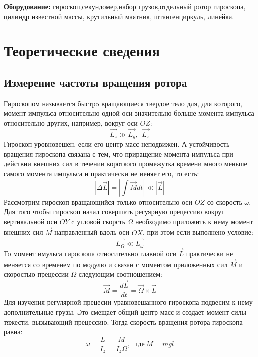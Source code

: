 \documentclass[a4paper,12pt]{article} %
\begin{document}
\textbf{Оборудование:} гироскоп,секундомер,набор грузов,отдельный ротор гироскопа,
 цилиндр известной массы, крутильный маятник,
 штангенциркуль, линейка.

\section{Теоретические сведения}
\subsection{Измерение частоты вращения ротора}

Гироскопом называется быстрo вращающиеся твердое тело для, для которого, момент
импульса относительно одной оси значительно больше момента импульса относительно других, например, вокруг оси $OZ$:
\begin{equation}
    \overrightarrow{L_z} \gg \overrightarrow{L_y}, \ \ \overrightarrow{L_x}
\end{equation}
Гироскоп уровновешен, если его центр масс неподвижен. А устойчивость вращения
 гироскопа связана с тем, что приращение момента импульса при действии внешних сил
 в течении короткого промежутка времени много меньше самого момента импульса и практически не
 иеняет его, то есть:
\begin{equation}
    |\Delta \overrightarrow{L}|=|\int \overrightarrow{M} dt |\ll |\overrightarrow{L} |
\end{equation}
Рассмотрим гироскоп вращающийся только относительно оси $OZ$ со скорость $\omega $.
Для того чтобы гироскоп начал совершать регуярную прецессию вокруг вертикальной оси $OY$ c угловой скорсть $\Omega$  
необходимо приложить к нему момент внешних сил $\overrightarrow{M}$ направленный вдоль оси $OX$. при этом если выполнено условие:
\begin{equation}
    \overrightarrow{L_{\Omega }} \ll \overrightarrow{L_{\omega}} 
\end{equation}
То момент имульса гироскопа относительно главной оси $\overrightarrow{L} $ практически не меняется со временем по модулю и связан
 с моментом приложенных сил $\overrightarrow{M}$ и скоростью прецессии $\Omega$ следующим соотношением:
\begin{equation}
    \overrightarrow{M}=\frac{d\overrightarrow{L}}{dt}=\overrightarrow{\Omega}\times \overrightarrow{L}
    \label{MLQ}
\end{equation}
Для изучения регулярной прецесии уравновешанного гироскопа подвесим к нему дополнительные грузы.
 Это смещает общий центр масс и создает момент силы тяжести,
 вызывающий прецессию. Тогда скорость вращения ротора гироскопа равна:
\begin{equation}
    \omega=\frac{L}{I_{z}}=\frac{M}{I_{z}\Omega},\ \ \ \text{где} \ M=mgl
\end{equation}
\end{document}
